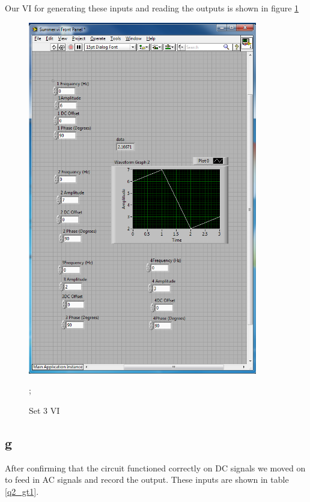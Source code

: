 \documentclass{article}
\theoremstyle{plain}
\theoremstyle{definition}
\theoremstyle{remark}
\begin{document}
Our VI for generating these inputs and reading the outputs is shown in figure \ref{q2_f2}

\begin{figure}[h]
\begin{center}
\includegraphics[width = 10cm]{set3problem2.png}
\end{center}
\caption{Set 3 VI};
\label{q2_f2}
\end{figure}

\subsection*{g}
After confirming that the circuit functioned correctly on DC signals we moved on to feed in AC signals and record the output.  These inputs are shown in table \ref{q2_gt1}. 
\end{document}
